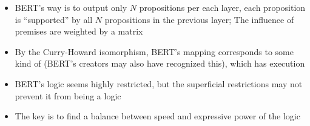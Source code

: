 \begin{itemize}
\item {}
{BERT's way is to output only $N$ propositions per each layer, each proposition is ``supported'' by all $N$ propositions in the previous layer;  The influence of premises are weighted by a matrix}

\item {}
{By the Curry-Howard isomorphism, BERT's mapping corresponds to some kind of  (BERT's creators may also have recognized this), which has  execution}

\item {}
{BERT's logic seems highly restricted, but the superficial restrictions may not prevent it from being a  logic}

\item {}
{The key is to find a balance between speed and expressive power of the logic}
\end{itemize}


